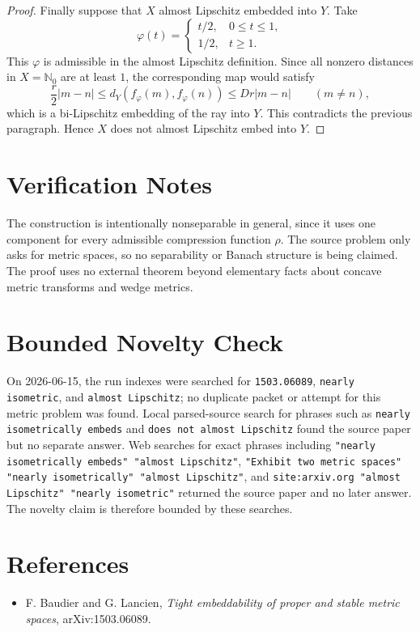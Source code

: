 \documentclass[11pt]{article}
\newcommand{\Nzero}{\mathbb N_0}
\begin{document}
\begin{proof}
Finally suppose that \(X\) almost Lipschitz embedded into \(Y\).  Take
\[
\varphi(t)=
\begin{cases}
t/2,&0\le t\le1,\\
1/2,&t\ge1.
\end{cases}
\]
This \(\varphi\) is admissible in the almost Lipschitz definition.  Since all
nonzero distances in \(X=\Nzero\) are at least \(1\), the corresponding map
would satisfy
\[
\frac r2 |m-n|
\le d_Y(f_\varphi(m),f_\varphi(n))
\le Dr |m-n|
\qquad(m\ne n),
\]
which is a bi-Lipschitz embedding of the ray into \(Y\).  This contradicts the
previous paragraph.  Hence \(X\) does not almost Lipschitz embed into \(Y\).
\end{proof}

\section*{Verification Notes}

The construction is intentionally nonseparable in general, since it uses one
component for every admissible compression function \(\rho\).  The source
problem only asks for metric spaces, so no separability or Banach structure is
being claimed.  The proof uses no external theorem beyond elementary facts
about concave metric transforms and wedge metrics.

\section*{Bounded Novelty Check}

On 2026-06-15, the run indexes were searched for \texttt{1503.06089},
\texttt{nearly isometric}, and \texttt{almost Lipschitz}; no duplicate packet
or attempt for this metric problem was found.  Local parsed-source search for
phrases such as \texttt{nearly isometrically embeds} and
\texttt{does not almost Lipschitz} found the source paper but no separate
answer.  Web searches for exact phrases including
\texttt{"nearly isometrically embeds" "almost Lipschitz"},
\texttt{"Exhibit two metric spaces" "nearly isometrically" "almost Lipschitz"},
and \texttt{site:arxiv.org "almost Lipschitz" "nearly isometric"} returned
the source paper and no later answer.  The novelty claim is therefore
bounded by these searches.

\section*{References}

\begin{itemize}[leftmargin=*]
\item F. Baudier and G. Lancien, \emph{Tight embeddability of proper and stable metric spaces}, arXiv:1503.06089.
\end{itemize}
\end{document}
